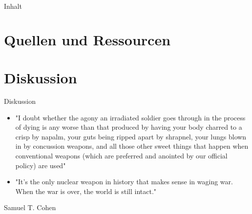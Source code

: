 

\maketitle
	\begin{frame}{Inhalt}
		\tableofcontents
	\end{frame}
	
	
	
	
	\section{Quellen und Ressourcen}
	\printbibliography
	\section{Diskussion}
	\begin{frame}{Diskussion}
		\begin{itemize}
			\item "I doubt whether the agony an irradiated soldier goes through in the process of dying is any worse than that produced by having your body charred to a crisp by napalm, your guts being ripped apart by shrapnel, your lungs blown in by concussion weapons, and all those other sweet things that happen when conventional weapons (which are preferred and anointed by our official policy) are used"
			\item "It’s the only nuclear weapon in history that makes sense in waging war. When the war is over, the world is still intact."
		\end{itemize}
		Samuel T. Cohen
	\end{frame}

